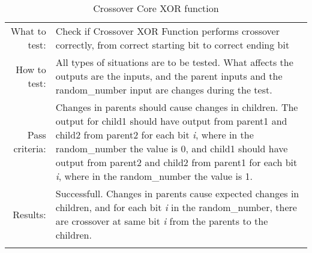 \begin{table}[H]
  \begin{tabular}{r | p{8cm}}
    \noalign{\smallskip}\hline\noalign{\smallskip}
    
    What to test:  & Check if Crossover XOR Function performs crossover
                     correctly, from correct starting bit to correct ending bit \\

    \noalign{\smallskip}\hline\noalign{\smallskip}

    How to test:   &    All types of situations are to be tested. 
                        What affects the outputs are the inputs, and the parent inputs            
                        and the random_number input are changes during the test. 
                        \\
                      
    \noalign{\smallskip}\hline\noalign{\smallskip}

    Pass criteria: &    Changes in parents should cause changes in children. 
                        The output for child1 should have output from parent1 and child2
                        from parent2 for each bit \emph{i}, where in the random\_number 
                        the value is 0, and child1 should have output from parent2 and 
                        child2 from parent1 for each bit \emph{i}, where in the 
                        random\_number the value is 1.
                        \\
    \noalign{\smallskip}\hline\noalign{\smallskip}
    
    Results: &      Successfull. 
                    Changes in parents cause expected changes in children, and for each
                    bit \emph{i} in the random\_number, there are crossover at same bit    
                    \emph{i} from the parents to the children.
                    \\
   \noalign{\smallskip}\hline\noalign{\smallskip}
  
  
  
  \end{tabular}
  \caption{Crossover Core XOR function}
  \label{testing:components:genetic_pipeline:crossover_core_xor}
\end{table}
